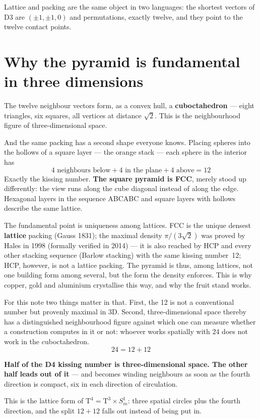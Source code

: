 Lattice and packing are the same object in two languages: the shortest
vectors of D3 are $(\pm1, \pm1, 0)$ and permutations, exactly twelve,
and they point to the twelve contact points.

\section{Why the pyramid is fundamental in three dimensions}

The twelve neighbour vectors form, as a convex hull, a
\textbf{cuboctahedron} --- eight triangles, six squares, all vertices
at distance $\sqrt2$. This is the neighbourhood figure of
three-dimensional space.

And the same packing has a second shape everyone knows. Placing spheres
into the hollows of a square layer --- the orange stack --- each sphere
in the interior has
\[
  4 \text{ neighbours below} + 4 \text{ in the plane}
  + 4 \text{ above} = 12
\]
Exactly the kissing number. \textbf{The square pyramid is FCC}, merely
stood up differently: the view runs along the cube diagonal instead of
along the edge. Hexagonal layers in the sequence ABCABC and square
layers with hollows describe the same lattice.

The fundamental point is uniqueness among lattices. FCC is the unique
densest \textbf{lattice} packing (Gauss 1831); the maximal density
$\pi/(3\sqrt2)$ was proved by Hales in 1998 (formally verified in 2014) --- it
is also reached by HCP and every other stacking sequence (Barlow
stacking) with the same kissing number~12; HCP, however, is not a lattice
packing. The pyramid is thus,
among lattices, not one building form among several, but the form the density enforces.
This is why copper, gold and aluminium crystallise this way, and why
the fruit stand works.

For this note two things matter in that. First, the 12 is not a
conventional number but provenly maximal in 3D. Second,
three-dimensional space thereby has a distinguished neighbourhood
figure against which one can measure whether a construction computes in
it or not: whoever works spatially with 24 does not work in the
cuboctahedron.
\[
  24 = 12 + 12
\]

\textbf{Half of the D4 kissing number is three-dimensional space. The
other half leads out of it} --- and becomes winding neighbours as soon
as the fourth direction is compact, six in each direction of
circulation.

This is the lattice form of
$\text{T}^4 = \text{T}^3 \times S^1_m$: three spatial circles plus the
fourth direction, and the split $12 + 12$ falls out instead of being
put in.

